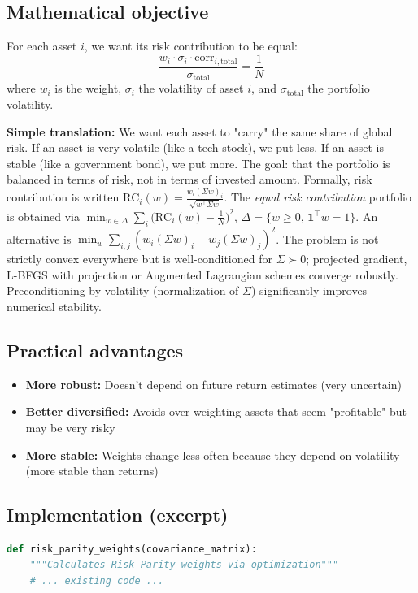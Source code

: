 \documentclass[11pt,a4paper]{article}
\begin{document}
\subsection{Mathematical objective}
For each asset \(i\), we want its risk contribution to be equal:
\[\frac{w_i \cdot \sigma_i \cdot \text{corr}_{i,\text{total}}}{\sigma_{\text{total}}} = \frac{1}{N}\]
where \(w_i\) is the weight, \(\sigma_i\) the volatility of asset \(i\), and \(\sigma_{\text{total}}\) the portfolio volatility.

\textbf{Simple translation:} We want each asset to "carry" the same share of global risk. If an asset is very volatile (like a tech stock), we put less. If an asset is stable (like a government bond), we put more. The goal: that the portfolio is balanced in terms of risk, not in terms of invested amount.
\noindent Formally, risk contribution is written \(\text{RC}_i(w)=\frac{w_i (\Sigma w)_i}{\sqrt{w^\top \Sigma w}}\). The \emph{equal risk contribution} portfolio is obtained via \(\min_{w\in\Delta}\sum_i\big(\text{RC}_i(w)-\frac{1}{N}\big)^2\), \(\Delta=\{w\ge 0,\, \mathbf{1}^\top w=1\}\). An alternative is \(\min_w \sum_{i,j} (w_i (\Sigma w)_i - w_j (\Sigma w)_j)^2\). The problem is not strictly convex everywhere but is well-conditioned for \(\Sigma\succ 0\); projected gradient, L-BFGS with projection or Augmented Lagrangian schemes converge robustly. Preconditioning by volatility (normalization of \(\Sigma\)) significantly improves numerical stability.

\subsection{Practical advantages}
\begin{itemize}
\item \textbf{More robust:} Doesn't depend on future return estimates (very uncertain)
\item \textbf{Better diversified:} Avoids over-weighting assets that seem "profitable" but may be very risky
\item \textbf{More stable:} Weights change less often because they depend on volatility (more stable than returns)
\end{itemize}

\subsection{Implementation (excerpt)}
\begin{lstlisting}[language=Python,caption={Risk Parity - File: \texttt{src/risk\_parity.py}}]
def risk_parity_weights(covariance_matrix):
    """Calculates Risk Parity weights via optimization"""
    # ... existing code ...
\end{lstlisting}
\end{document}
